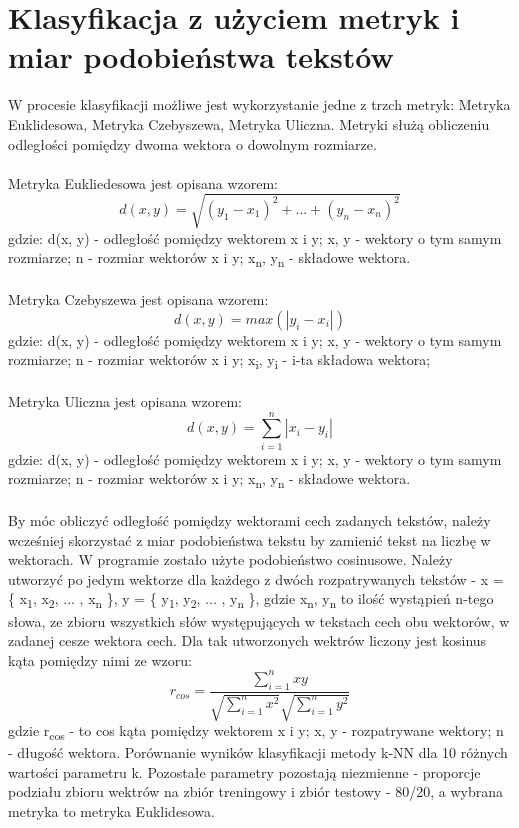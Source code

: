\documentclass{classrep}
\begin{document}
\section{Klasyfikacja z użyciem metryk i miar podobieństwa tekstów}
W procesie klasyfikacji możliwe jest wykorzystanie jedne z trzch metryk: Metryka Euklidesowa, Metryka Czebyszewa, Metryka Uliczna. Metryki służą obliczeniu odległości pomiędzy dwoma wektora o dowolnym rozmiarze.\\\\ Metryka Eukliedesowa\cite{dane} jest opisana wzorem: 
\begin{equation} d(x, y) = \sqrt{(y_1 - x_1)^2 + ... + (y_n - x_n)^2}  \end{equation}
gdzie: d(x, y) - odległość pomiędzy wektorem x i y; x, y - wektory o tym samym rozmiarze; n - rozmiar wektorów x i y;  x\textsubscript{n}, y\textsubscript{n} - składowe wektora. 
\\\\
Metryka Czebyszewa\cite{dane} jest opisana wzorem: 
\begin{equation} d(x, y) = max(|y_i - x_i|) \end{equation}
gdzie: d(x, y) - odległość pomiędzy wektorem x i y; x, y - wektory o tym samym rozmiarze; n - rozmiar wektorów x i y;  x\textsubscript{i}, y\textsubscript{i} - i-ta składowa wektora;
\\\\
Metryka Uliczna\cite{dane} jest opisana wzorem: 
\begin{equation} d(x, y) = \sum_{i = 1}^{n} |x_i - y_i| \end{equation}
gdzie: d(x, y) - odległość pomiędzy wektorem x i y; x, y - wektory o tym samym rozmiarze; n - rozmiar wektorów x i y;  x\textsubscript{n}, y\textsubscript{n} - składowe wektora. 
\\\\
By móc obliczyć odległość pomiędzy wektorami cech zadanych tekstów, należy wcześniej skorzystać z miar podobieństwa tekstu by zamienić tekst na liczbę w wektorach. W programie zostało użyte podobieństwo cosinusowe\cite{wyklad}. Należy utworzyć po jedym wektorze dla każdego z dwóch rozpatrywanych tekstów - x = \{ x\textsubscript{1}, x\textsubscript{2}, ... , x\textsubscript{n} \},  y = \{ y\textsubscript{1}, y\textsubscript{2}, ... , y\textsubscript{n} \}, gdzie x\textsubscript{n}, y\textsubscript{n}  to ilość wystąpień n-tego słowa, ze zbioru wszystkich słów występujących w tekstach cech obu wektorów, w zadanej cesze wektora cech. Dla tak utworzonych wektrów liczony jest kosinus kąta pomiędzy nimi ze wzoru:
\begin{equation} r_{cos} = \frac{\sum_{i = 1}^{n} x y}{\sqrt{\sum_{i = 1}^{n} x^2}\sqrt{\sum_{i = 1}^{n} y^2}} \end{equation}
gdzie r\textsubscript{cos} - to cos kąta pomiędzy wektorem x i y; x, y - rozpatrywane wektory; n - długość wektora.
\newline
Porównanie wyników klasyfikacji metody k-NN dla 10 różnych wartości parametru k. Pozostałe parametry pozostają niezmienne - proporcje podziału zbioru wektrów na zbiór treningowy i zbiór testowy - 80/20, a wybrana metryka to metryka Euklidesowa. 
\end{document}
